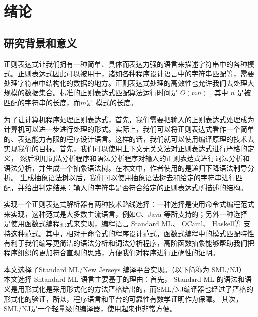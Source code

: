 \documentclass[openany,oneside]{book}
\theoremstyle{definition}
\begin{document}
\frontmatter
\sloppy %




\tableofcontents
{\xiaosi}
\clearpage{\pagestyle{empty}\cleardoublepage}

\mainmatter
{}                        %

\chapter{绪论}

	
	
\section{研究背景和意义}
	正则表达式让我们拥有一种简单、具体而表达力强的语言来描述字符串中的各种模式。正则表达式因此可以被用于，诸如各种程序设计语言中的字符串匹配等，需要处理字符串中结构化的数据的地方。正则表达式处理的高效性也允许我们去处理大规模的数据集合。标准的正则表达式匹配算法运行时间是 \(O\left( mn \right) \) \cite{Sedg92a} , 其中 \(n\) 是被匹配的字符串的长度，而\(m\)是 模式的长度。
	
	
	为了让计算机程序处理正则表达式，首先，我们需要把输入的正则表达式处理成为计算机可以进一步进行处理的形式。实际上，我们可以将正则表达式看作一个简单的、表达能力有限的程序设计语言。这样的话，我们就可以使用编译原理的技术去实现我们的目标。首先，我们可以使用上下文无关文法对正则表达式进行严格的定义， 然后利用词法分析程序和语法分析程序对输入的正则表达式进行词法分析和语法分析，并生成一个抽象语法树。在本文中，作者使用的是递归下降语法制导分析。 生成抽象语法树以后，我们可以使用抽象语法树去和给定的字符串进行匹配，并给出判定结果：输入的字符串是否符合给定的正则表达式所描述的结构。
	
  	实现一个正则表达式解析器有两种技术路线选择：一种选择是使用命令式编程范式来实现，这种范式是大多数主流语言，例如C、Java 等所支持的；另外一种选择是使用函数式编程范式来实现，编程语言 Standard ML、 OCaml、 Haskell等 支持这种范式。其中，相对于命令式的程序设计范式，函数式编程中的模式匹配特性有利于我们编写更简洁的语法分析和词法分析程序，高阶函数抽象能够帮助我们把程序组织的更加符合直观的思路，方便我们对程序进行正确性的证明。
  	
  	本文选择了Standard ML/New Jerseys 编译平台实现。（以下简称为 SML/NJ） 本文选择 Sntandard ML 语言主要基于的理由：首先， Standard ML 的语法和语义是用形式化是采用形式化的方法严格给出的，而SML/NJ编译器也经过了严格的形式化的验证，所以，程序语言和平台的可靠性有数学证明作为保障。 其次，SML/NJ是一个轻量级的编译器，使用起来也非常方便。
\end{document}
